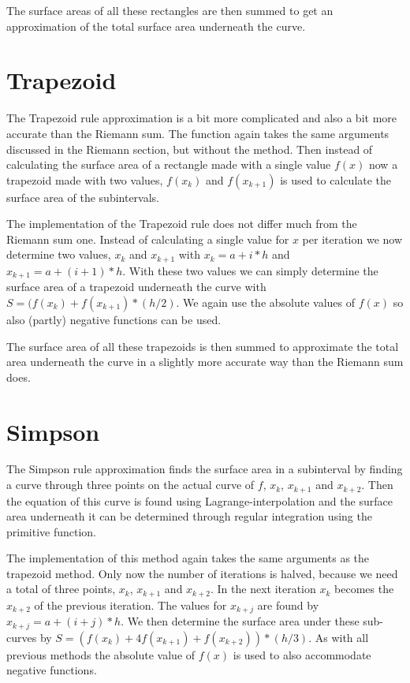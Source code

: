 \documentclass[a4paper,12px]{article}
\begin{document}
The surface areas of all these rectangles are then summed to get an
approximation of the total surface area underneath the curve.

\section{Trapezoid}

The Trapezoid rule approximation is a bit more complicated and also a bit more
accurate than the Riemann sum. The function again takes the same arguments
discussed in the Riemann section, but without the method. Then instead of
calculating the surface area of a rectangle made with a single value $f(x)$
now a trapezoid made with two values, $f(x_k)$ and $f(x_{k+1})$ is used to
calculate the surface area of the subintervals.

The implementation of the Trapezoid rule does not differ much from the Riemann
sum one. Instead of calculating a single value for $x$ per iteration we now
determine two values, $x_k$ and $x_{k+1}$ with $x_k=a+i*h$ and
$x_{k+1}=a+(i+1)*h$. With these two values we can simply determine the surface
area of a trapezoid underneath the curve with $S=(f(x_k)+f(x_{k+1})*(h/2)$. We
again use the absolute values of $f(x)$ so also (partly) negative functions can
be used.

The surface area of all these trapezoids is then summed to approximate the total
area underneath the curve in a slightly more accurate way than the Riemann sum
does.

\section{Simpson}

The Simpson rule approximation finds the surface area in a subinterval by
finding a curve through three points on the actual curve of $f$, $x_k$,
$x_{k+1}$ and $x_{k+2}$. Then the equation of this
curve is found using Lagrange-interpolation and the surface area underneath it
can be determined through regular integration using the primitive function.

The implementation of this method again takes the same arguments as the trapezoid
method. Only now the number of iterations is halved, because we need a total of
three points, $x_k$, $x_{k+1}$ and $x_{k+2}$. In the next iteration $x_k$
becomes the $x_{k+2}$ of the previous iteration. The values for $x_{k+j}$ are
found by $x_{k+j}=a+(i+j)*h$. We then determine the surface area under these
sub-curves by $S=(f(x_k) + 4f(x_{k+1}) + f(x_{k+2}))*(h/3)$. As with all
previous methods the absolute value of $f(x)$ is used to also accommodate
negative functions.
\end{document}
